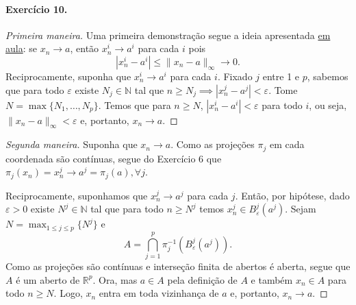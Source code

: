 \documentclass[12pt,a4paper]{article}
\begin{document}
\paragraph{Exercício 10.}
\begin{proof}[Primeira maneira]
    Uma primeira demonstração segue a ideia apresentada
    \href{https://www.youtube.com/watch?v=ph3VUO0AVRA&list=PLMG2ETzS-iy95U-hwPhPRSGRHBFm8Dk2x&index=5}{em aula}: se $x_n \to a$, então
    $x_n^i \to a^i$ para cada $i$ pois
    \begin{equation*}
        |x_n^i - a^i| \leq \|x_n - a\|_{\infty} \to 0.
    \end{equation*}
    Reciprocamente, suponha que $x_n^i \to a^i$ para cada $i$. Fixado $j$ entre 1 e $p$, sabemos que para todo $\varepsilon$ existe
    $N_j\in\mathbb{N}$ tal que $n\geq N_j \implies |x_n^j - a^j| < \varepsilon$. Tome $\displaystyle{N = \max\{N_1, \dots, N_p\}}$. Temos que
    para $n\geq N$, $|x_n^i - a^i| < \varepsilon$ para todo $i$, ou seja, $\|x_n - a\|_{\infty} < \varepsilon$ e, portanto, 
    $x_n \to a$.
\end{proof}

\begin{proof}[Segunda maneira]
    Suponha que $x_n \to a$. Como as projeções $\pi_j$ em cada coordenada são contínuas,
    segue do Exercício 6 que $\pi_j(x_n) = x_n^j \to a^j = \pi_j(a), \forall j$. 
    
    Reciprocamente, suponhamos que $x_n^j \to a^j$ para cada $j$. Então, por hipótese, dado $\varepsilon > 0$ existe
    $N^j\in\mathbb{N}$ tal que para todo $n\geq N^j$ temos $x_n^j \in B_{\varepsilon}^j(a^j)$. 
    Sejam $\displaystyle{N = \max_{1\leq j\leq p}\{N^j\}}$ e
    \begin{equation*}
        A = \bigcap_{j=1}^p \pi_j^{-1}(B_{\varepsilon}^j(a^j)).
    \end{equation*}
    Como as projeções são contínuas e interseção finita de abertos é aberta, segue que $A$ é um aberto de $\mathbb{R}^p$.
    Ora, mas $a\in A$ pela definição de $A$ e também $x_n \in A$ para todo $n\geq N$. Logo, $x_n$ entra em toda vizinhança
    de $a$ e, portanto, $x_n \to a$.
\end{proof}
\end{document}
